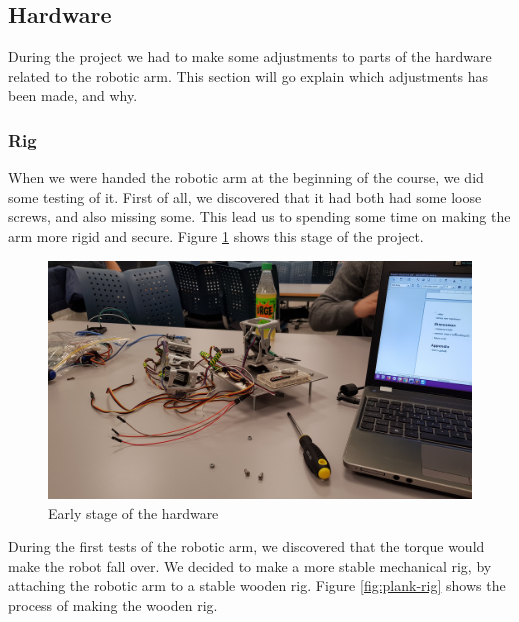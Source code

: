 \documentclass[11pt,a4paper, titlepage]{report}
\begin{document}
	\subsection{Hardware}
	During the project we had to make some adjustments to parts of the hardware related to the robotic arm. This section will go explain which adjustments has been made, and why.
	\subsubsection{Rig}
	When we were handed the robotic arm at the beginning of the course, we did some testing of it. First of all, we discovered that it had both had some loose screws, and also missing some. This lead us to spending some time on making the arm more rigid and secure. Figure \ref{fig:early-rig} shows this stage of the project.
	
	\begin{figure}[H]
		\centering
		\includegraphics[width=0.8\linewidth]{../Diagrams/early-setup.jpg}
		\caption{Early stage of the hardware}
		\label{fig:early-rig}
	\end{figure}
	
	During the first tests of the robotic arm, we discovered that the torque would make the robot fall over. We decided to make a more stable mechanical rig, by attaching the robotic arm to a stable wooden rig. Figure \ref{fig:plank-rig} shows the process of making the wooden rig.
	
\end{document}
